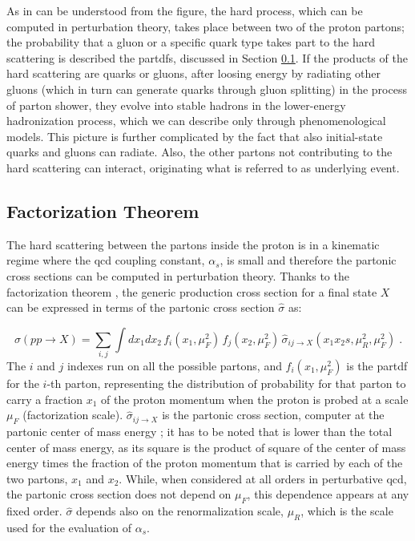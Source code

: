 As in can be understood from the figure, the hard process, which can be computed in perturbation theory, takes place between two of the proton partons; the probability that a gluon or a specific quark type takes part to the hard scattering is described the \glspl{partdf}, discussed in Section \ref{sec:ppint:hardscatter}. If the products of the hard scattering are quarks or gluons, after loosing energy by radiating other gluons (which in turn can generate quarks through gluon splitting) in the process of parton shower, they evolve into stable hadrons in the lower-energy hadronization process, which we can describe only through phenomenological models.
This picture is further complicated by the fact that also initial-state quarks and gluons can radiate. Also, the other partons not contributing to the hard scattering can interact, originating what is referred to as underlying event. 

\subsection{Factorization Theorem}
\label{sec:ppint:hardscatter}

The hard scattering between the partons inside the proton is in a kinematic regime where the \gls{qcd} coupling constant, $\alpha_s$, 
is small and therefore the partonic cross sections can be computed in perturbation theory. 
Thanks to the factorization theorem \cite{doi:10.1146}, the generic production cross section for a final state $X$ can be expressed in terms of the partonic cross section $\hat\sigma$ as:

\begin{equation}
  \sigma(pp\rightarrow X) = \sum_{i,j} \int dx_1 dx_2\, 
     f_{i}(x_1,\mu_F^2)\, f_{j}(x_2,\mu_F^2)\, 
     \hat\sigma_{ij\rightarrow X}(x_1 x_2 s, \mu_R^2, \mu_F^2) \; .
  \label{eq:general-cross-section}
\end{equation}
The $i$ and $j$ indexes run on all the possible partons, and $f_{i}(x_1,\mu_F^2)$ is the \gls{partdf} for the $i$-th parton, representing 
the distribution of probability for that parton to carry a fraction $x_1$ of the proton momentum when the proton is probed at a scale $\mu_F$
(factorization scale). $\hat\sigma_{ij\rightarrow X}$ is the partonic cross section, computer at the partonic center of mass energy \cmpart;   
it has to be noted that \cmpart is lower than the total center of mass energy, as its square is the product of square of the center of mass energy times
the fraction of the proton momentum that is carried by each of the two partons, $x_1$ and $x_2$. 
While, when considered at all orders in perturbative \gls{qcd}, the partonic cross section does not depend on $\mu_F$,
this dependence appears at any fixed order. $\hat\sigma$ depends also on the renormalization scale, $\mu_R$, which is the scale used for the evaluation of $\alpha_s$.




